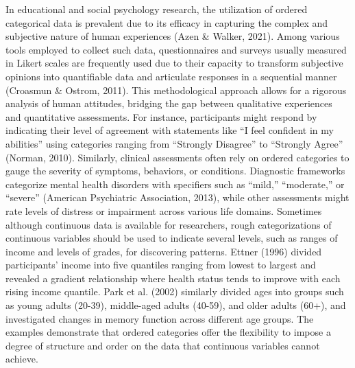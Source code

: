 \documentclass[
  man]{apa6}
\begin{document}
In educational and social psychology research, the utilization of ordered categorical data is prevalent due to its efficacy in capturing the complex and subjective nature of human experiences (Azen \& Walker, 2021). Among various tools employed to collect such data, questionnaires and surveys usually measured in Likert scales are frequently used due to their capacity to transform subjective opinions into quantifiable data and articulate responses in a sequential manner (Croasmun \& Ostrom, 2011). This methodological approach allows for a rigorous analysis of human attitudes, bridging the gap between qualitative experiences and quantitative assessments. For instance, participants might respond by indicating their level of agreement with statements like ``I feel confident in my abilities'' using categories ranging from ``Strongly Disagree'' to ``Strongly Agree'' (Norman, 2010). Similarly, clinical assessments often rely on ordered categories to gauge the severity of symptoms, behaviors, or conditions. Diagnostic frameworks categorize mental health disorders with specifiers such as ``mild,'' ``moderate,'' or ``severe'' (American Psychiatric Association, 2013), while other assessments might rate levels of distress or impairment across various life domains. Sometimes although continuous data is available for researchers, rough categorizations of continuous variables should be used to indicate several levels, such as ranges of income and levels of grades, for discovering patterns. Ettner (1996) divided participants' income into five quantiles ranging from lowest to largest and revealed a gradient relationship where health status tends to improve with each rising income quantile. Park et al. (2002) similarly divided ages into groups such as young adults (20-39), middle-aged adults (40-59), and older adults (60+), and investigated changes in memory function across different age groups. The examples demonstrate that ordered categories offer the flexibility to impose a degree of structure and order on the data that continuous variables cannot achieve.
\end{document}
